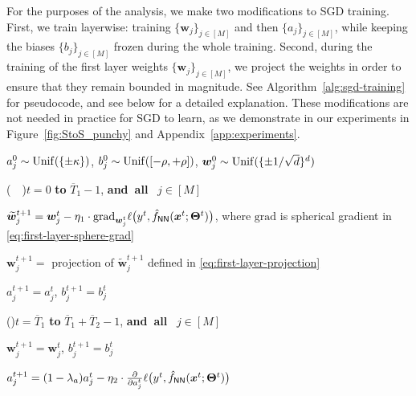 \documentclass[11pt]{article}
\newcommand{\<}{\langle}
\renewcommand{\>}{\rangle}
\theoremstyle{definition}
\def\bw{{\boldsymbol w}}
\def\bx{{\boldsymbol x}}
\def\bTheta{{\boldsymbol \Theta}}
\def\hf{{\hat f}}
\def\Unif{{\rm Unif}}
\def\Unif{{\sf Unif}}
\def\NN{{\sf NN}}
\def\Unif{{\sf Unif}}
\def\NN{{\sf NN}}
\def\bTheta{{\boldsymbol \Theta}}
\def\NN{{\sf NN}}
\def\bw{{\boldsymbol w}}
\def\bx{{\boldsymbol x}}
\def\Unif{{\rm Unif}}
\def\bTheta{{\boldsymbol \Theta}}
\def\hf{\hat f}
\def\tbw{\widetilde \bw}
\def\oT{\overline{T}}
\def\grad{\text{grad}}
\def\tbw{\widetilde{\bw}}
\begin{document}
For the purposes of the analysis, we make two modifications to SGD training. First, we train layerwise: training $\{\bw_j\}_{j \in [M]}$ and then $\{a_j\}_{j \in [M]}$, while keeping the biases $\{ b_j\}_{j \in [M]}$ frozen during the whole training. Second, during the training of the first layer weights $\{\bw_j\}_{j \in [M]}$, we project the weights in order to ensure that they remain bounded in magnitude. See Algorithm~\ref{alg:sgd-training} for pseudocode, and see below for a detailed explanation. These modifications are not needed in practice for SGD to learn, as we demonstrate in our experiments in Figure~\ref{fig:StoS_punchy} and Appendix~\ref{app:experiments}.

%
\SetAlgoVlined%
\LinesNumbered%
\newcommand\mycommfont[1]{\small\ttfamily\textcolor{blue}{#1}}
\begin{algorithm}
\caption{Layerwise online-SGD with init scales $\kappa,\rho > 0$, learning rates $\eta_1,\eta_2 > 0$, step counts $\oT_1,\oT_2 > 0$, second-layer ridge-regularization $\lambda_a > 0$, and projection params $r,\Delta > 0$}\label{alg:sgd-training}

$a^0_j \sim \Unif (\{\pm \kappa \})$, $b^0_j \sim \Unif ([-\rho,+\rho ])$, $\bw_j^0 \sim \Unif ( \{ \pm 1/\sqrt{d} \}^d )$ $\;\;$ 

\For($\quad$){$t = 0$ {\bfseries to} $\oT_1-1$, \mbox{\bfseries and all } $j \in [M]$}{
$\tbw_j^{t+1} = \bw_j^t - \eta_1 \cdot \grad_{\bw_j^t} \ell \big( y^t , \hf_{\NN} (\bx^t ; \bTheta^t ) \big)$, where $\grad$ is spherical gradient in \eqref{eq:first-layer-sphere-grad}

$\bw_j^{t+1} = $ projection of $\tbw_j^{t+1}$ defined in  \eqref{eq:first-layer-projection}

$a_j^{t+1} = a_j^t$, $b_j^{t+1} = b_j^t$
}

\For(\quad{}){$t = \oT_1$ {\bfseries to} $\oT_1+\oT_2-1$, \mbox{\bfseries and all } $j \in [M]$}{
$\bw_j^{t+1} = \bw_j^t$, $b_j^{t+1} = b_j^t$

$a_j^{t+1} = (1-\lambda_a)a_j^t - \eta_2 \cdot \frac{\partial}{\partial a_j^t} \ell \big( y^t , \hf_{\NN} (\bx^t ; \bTheta^t ) \big)$
}
\end{algorithm}
\end{document}
